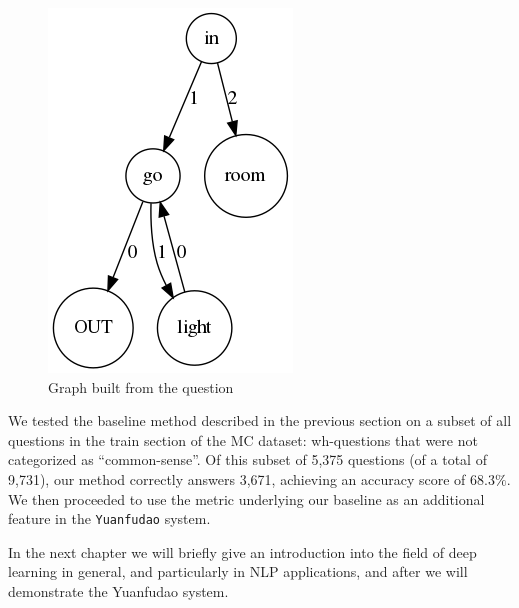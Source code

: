 \begin{figure}
	\centering
	\includegraphics[scale=0.3]{figures/compdef}
	\caption{Graph built from the question}
	\label{fig:merge3}
\end{figure}

We tested the baseline method described in the previous section on a
subset of all questions in the train section of the MC dataset:
wh-questions that were not
categorized as ``common-sense''. Of this subset of 5,375 questions (of a
total of 9,731), our
method correctly answers 3,671, achieving an accuracy score of $68.3\%$.
We then proceeded to use the metric underlying our baseline as an
additional feature in the \texttt{Yuanfudao} system. 

In the next chapter we will briefly give an introduction into the field of deep learning in general, and particularly in NLP applications, and after we will demonstrate the Yuanfudao system.